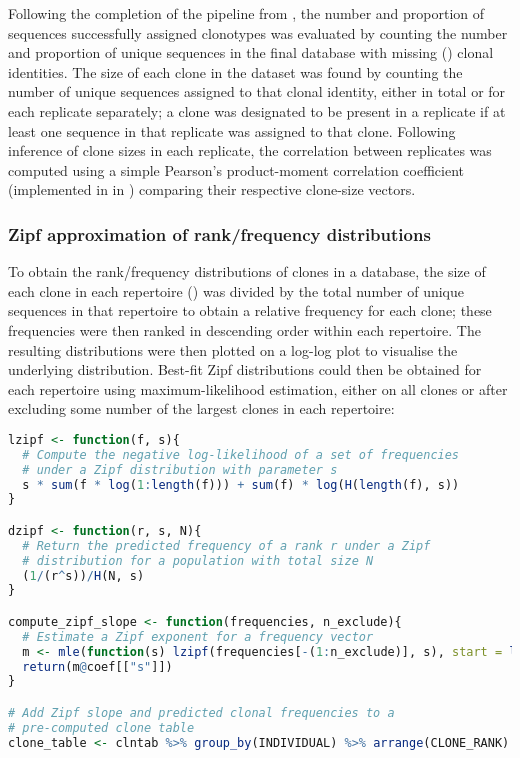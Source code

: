 Following the completion of the pipeline from , the number and proportion of sequences successfully assigned clonotypes was evaluated by counting the number and proportion of unique sequences in the final  database with missing () clonal identities. The size of each clone in the dataset was found by counting the number of unique sequences assigned to that clonal identity, either in total or for each replicate separately; a clone was designated to be present in a replicate if at least one sequence in that replicate was assigned to that clone. Following inference of clone sizes in each replicate, the correlation between replicates was computed using a simple Pearson's product-moment correlation coefficient (implemented in  in ) comparing their respective clone-size vectors.

\subsubsection{Zipf approximation of rank/frequency distributions}
\label{sec:methods_comp_igdownstream_zipf}

To obtain the rank/frequency distributions of clones in a  database, the size of each clone in each repertoire () was divided by the total number of unique sequences in that repertoire to obtain a relative frequency for each clone; these frequencies were then ranked in descending order within each repertoire. The resulting distributions were then plotted on a log-log plot to visualise the underlying distribution. Best-fit Zipf distributions could then be obtained for each repertoire using maximum-likelihood estimation, either on all clones or after excluding some number of the largest clones in each repertoire:

\begin{lstlisting}[language=R]
lzipf <- function(f, s){
  # Compute the negative log-likelihood of a set of frequencies
  # under a Zipf distribution with parameter s
  s * sum(f * log(1:length(f))) + sum(f) * log(H(length(f), s))
}

dzipf <- function(r, s, N){
  # Return the predicted frequency of a rank r under a Zipf 
  # distribution for a population with total size N
  (1/(r^s))/H(N, s)
}

compute_zipf_slope <- function(frequencies, n_exclude){
  # Estimate a Zipf exponent for a frequency vector
  m <- mle(function(s) lzipf(frequencies[-(1:n_exclude)], s), start = list(s=1))
  return(m@coef[["s"]])
}

# Add Zipf slope and predicted clonal frequencies to a
# pre-computed clone table
clone_table <- clntab %>% group_by(INDIVIDUAL) %>% arrange(CLONE_RANK) %>% mutate(S = compute_zipf_slope(CLONE_SIZE, n_exclude), EXP_FREQUENCY = dzipf(CLONE_RANK, S, n()), EXP_SIZE = sum(CLONE_SIZE) * EXP_FREQUENCY))
\end{lstlisting}


